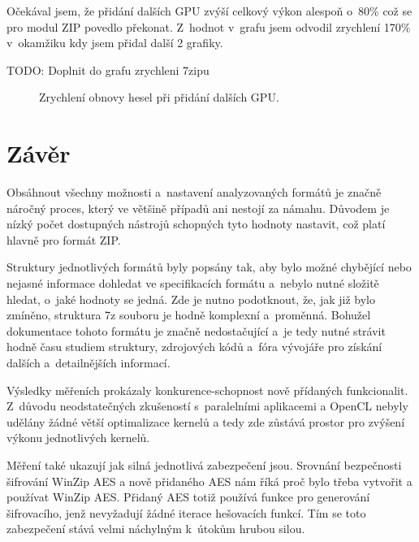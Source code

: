 Očekával jsem, že přidání dalších GPU zvýší celkový výkon alespoň o~80\% což se pro modul ZIP
povedlo překonat. Z~hodnot v~grafu jsem odvodil zrychlení 170\% v~okamžiku kdy jsem přidal další
2 grafiky.

TODO: Doplnit do grafu zrychleni 7zipu
\begin{center}
    \begin{figure}[ht]
	\caption{Zrychlení obnovy hesel při přidání dalších GPU.}
	\label{memory}
    \end{figure}
\end{center}

\chapter{Závěr}
Obsáhnout všechny možnosti a~nastavení analyzovaných formátů je značně náročný proces, který
ve většině případů ani nestojí za námahu. Důvodem je nízký počet dostupných nástrojů schopných
tyto hodnoty nastavit, což platí hlavně pro formát ZIP.

 Struktury jednotlivých formátů byly popsány tak, aby bylo možné chybějící nebo nejasné informace
dohledat ve specifikacích formátu a~nebylo nutné složitě hledat, o~jaké hodnoty se jedná. Zde
je nutno podotknout, že, jak již bylo zmíněno, struktura 7z souboru je hodně komplexní a~proměnná.
Bohužel dokumentace tohoto formátu je značně nedostačující a~je tedy nutné strávit hodně času
studiem struktury, zdrojových kódů a~fóra vývojáře pro získání dalších a~detailnějších informací.

 Výsledky měřeních prokázaly konkurence-schopnost nově přídaných funkcionalit. Z~důvodu
neodstatečných zkušeností s~paralelními aplikacemi a OpenCL nebyly udělány žádné větší
optimalizace kernelů a tedy zde zůstává prostor pro zvýšení výkonu jednotlivých kernelů. 

 Měření také ukazují jak silná jednotlivá zabezpečení jsou. Srovnání bezpečnosti šifrování
WinZip AES a nově přidaného AES nám říká proč bylo třeba vytvořit a používat WinZip AES. Přidaný
AES totiž používá funkce pro generování šifrovacího, jenž nevyžadují žádné iterace hešovacích
funkcí. Tím se toto zabezpečení stává velmi náchylným k~útokům hrubou silou.

